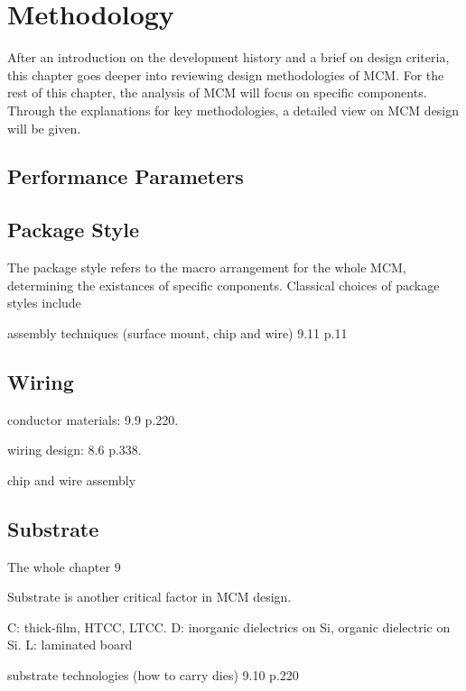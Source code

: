 
\chapter{Methodology}
\begin{spacing}{1.5}
\setlength{\parskip}{0.3in}

After an introduction on the development history and a brief on design criteria, this chapter goes deeper into reviewing design methodologies of MCM. For the rest of this chapter, the analysis of MCM will focus on specific components. Through the explanations for key methodologies, a detailed view on MCM design will be given. 

\section{Performance Parameters} 



\section{Package Style}

The package style refers to the macro arrangement for the whole MCM, determining the existances of specific conponents. Classical choices of package styles include 

assembly techniques (surface mount, chip and wire) 9.11 p.11 \cite{chen2006vlsi} 

\section{Wiring}

conductor materials: 9.9 p.220. \cite{chen2006vlsi}

wiring design: 8.6 p.338. \cite{tummala2001fundamentals}

chip and wire assembly

\section{Substrate}

The whole chapter 9 \cite{chen2006vlsi}

Substrate is another critical factor in MCM design. 

C: thick-film, HTCC, LTCC. D: inorganic dielectrics on Si, organic dielectric on Si. L: laminated board

substrate technologies (how to carry dies) 9.10 p.220 \cite{chen2006vlsi} 

\end{spacing}
\newpage
